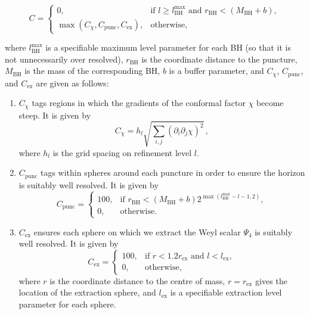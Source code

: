 \begin{equation}
    C=
    \begin{cases}
        0, &\text{if }l\geq l_{\mathrm{BH}}^{\max}
        \text{ and } r_{\mathrm{BH}} < (M_{\mathrm{BH}}+b),\\
        \max(C_{\chi},C_{\mathrm{punc}},C_{\mathrm{ex}}),&
        \text{otherwise},
    \end{cases}
\end{equation}

where $l_{\mathrm{BH}}^{\max}$ is a specifiable maximum level parameter
for each BH (so that it is not unnecessarily over resolved),
$r_{\mathrm{BH}}$ is the coordinate distance to the puncture,
$M_{\mathrm{BH}}$ is the mass of the corresponding BH, $b$ is a buffer
parameter, and $C_\chi$, $C_{\mathrm{punc}}$, and $C_{\mathrm{ex}}$ are
given as follows:
\begin{enumerate}
    \item
        $C_{\chi}$ tags regions in which the gradients of the conformal
        factor $\chi$ become steep. It is given by
        \begin{equation}
            C_{\chi} = h_l\sqrt{\sum_{i,j}\left(
            \partial_i\partial_j\chi\right)^2}\,,
        \end{equation}
        where $h_l$ is the grid spacing on refinement level $l$.
    \item
        $C_{\mathrm{punc}}$ tags within spheres around each puncture in
        order to ensure the horizon is suitably well resolved. It is given
        by
        \begin{equation}
            C_{\mathrm{punc}} =
            \begin{cases}
                100, &\text{if } r_{\mathrm{BH}} <
                (M_{\mathrm{BH}}+b) 2^{\max(l_\mathrm{BH}^{\max}-l-1, 2)}, \\
                0, & \text{otherwise}.
            \end{cases}
        \end{equation}
    \item
        $C_{\mathrm{ex}}$ ensures each sphere on which we extract the
        Weyl scalar $\Psi_4$ is suitably well resolved. It is given by
        \begin{equation}
            C_{\mathrm{ex}} =
            \begin{cases}
                100, &\text{if } r < 1.2r_{\mathrm{ex}} \text{ and }
                l < l_{\mathrm{ex}}, \\
                0, & \text{otherwise},
            \end{cases}
        \end{equation}
         where $r$ is the coordinate distance to the centre of mass,
         $r=r_{\mathrm{ex}}$ gives the location of the extraction sphere,
         and $l_{\mathrm{ex}}$ is a specifiable extraction level parameter
         for each sphere.
\end{enumerate}
